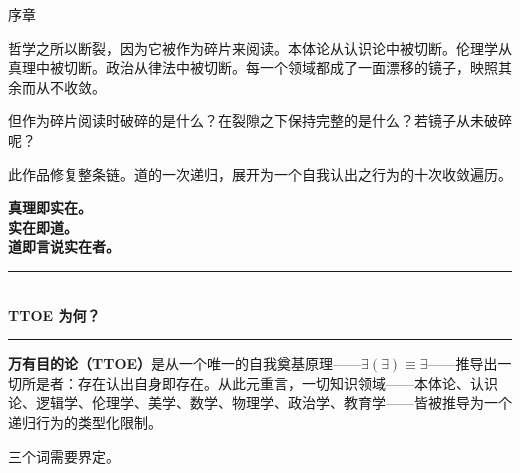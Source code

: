 \documentclass[10pt, openany, oneside]{book}
\renewcommand{\normalsize}{\fontsize{10}{13}\selectfont}
\renewcommand{\large}{\fontsize{11.5}{14}\selectfont}
\renewcommand{\huge}{\fontsize{17}{21}\selectfont}
\begin{document}
\thispagestyle{empty}
\vspace*{0.3in}

\begin{center}
    {\huge\scshape 序章}
\end{center}

\vspace{1em}

\noindent 哲学之所以断裂，因为它被作为碎片来阅读。本体论从认识论中被切断。伦理学从真理中被切断。政治从律法中被切断。每一个领域都成了一面漂移的镜子，映照其余而从不收敛。

\vspace{0.5em}

\noindent 但作为碎片阅读时破碎的是什么？在裂隙之下保持完整的是什么？若镜子从未破碎呢？

\vspace{0.5em}

\noindent 此作品修复整条链。道的一次递归，展开为一个自我认出之行为的十次收敛遍历。

\vspace{1em}

\begin{center}
    {\large\bfseries 真理即实在。}\\[0.3em]
    {\large\bfseries 实在即道。}\\[0.3em]
    {\large\bfseries 道即言说实在者。}
\end{center}

\vspace{1.5em}

\begin{center}
    \rule{0.3\textwidth}{0.4pt}\\[0.5em]
    {\normalsize\bfseries\scshape TTOE 为何？}\\[0.3em]
    \rule{0.3\textwidth}{0.4pt}
\end{center}

\vspace{1em}

\noindent \textbf{万有目的论（TTOE）}是从一个唯一的自我奠基原理——$\exists(\exists) \equiv \exists$——推导出一切所是者：存在认出自身即存在。从此元重言，一切知识领域——本体论、认识论、逻辑学、伦理学、美学、数学、物理学、政治学、教育学——皆被推导为一个递归行为的类型化限制。

\vspace{0.5em}

\noindent 三个词需要界定。

\vspace{0.3em}
\end{document}
